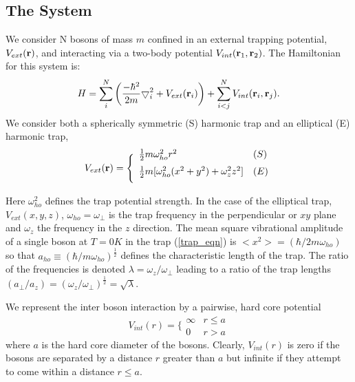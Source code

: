 \documentclass[aps,pra,twocolumn,groupedaddress]{revtex4}
\def\strut{\rule[-0.5cm]{0cm}{1cm}}
\begin{document}
\subsection{The System}
We consider N bosons of mass $m$ confined in an external 
trapping potential, $V_{ext}({\bf r})$, and interacting via a two-body 
potential $V_{int}({\bf r}_1,{\bf r}_2)$.  
The Hamiltonian for this system is:
\begin{equation}
    H = \sum_i^N \left(
        \frac{-\hbar^2}{2m}
        { \bigtriangledown }_{i}^2 +
        V_{ext}({\bf{r}}_i)\right)  +
        \sum_{i<j}^{N} V_{int}({\bf{r}}_i,{\bf{r}}_j).
\end{equation}
We consider both a 
spherically symmetric (S) harmonic trap and an elliptical (E) harmonic trap,
\begin{equation}
V_{ext}({\bf r}) = 
\Bigg\{
\begin{array}{ll}
        \frac{1}{2}m\omega_{ho}^2r^2 & (S)\\
\strut
	\frac{1}{2}m[\omega_{ho}^2(x^2+y^2) + \omega_z^2z^2] & (E)
\label{trap_eqn}
\end{array}
\end{equation}
Here $\omega_{ho}^2$ defines the trap potential strength.  In the case of the
elliptical trap, $V_{ext}(x,y,z)$, $\omega_{ho}=\omega_{\perp}$ is the trap frequency
in the perpendicular or $xy$ plane and $\omega_z$ the frequency in the $z$
direction.
The mean square vibrational amplitude of a single boson at $T=0K$ in the 
trap (\ref{trap_eqn}) is $<x^2>=(\hbar/2m\omega_{ho})$ so that 
$a_{ho} \equiv (\hbar/m\omega_{ho})^{\frac{1}{2}}$ defines the 
characteristic length
of the trap.  The ratio of the frequencies is denoted 
$\lambda=\omega_z/\omega_{\perp}$ leading to a ratio of the
trap lengths
$(a_{\perp}/a_z)=(\omega_z/\omega_{\perp})^{\frac{1}{2}} = \sqrt{\lambda}$.

We represent the inter boson interaction by a pairwise, hard core potential
\begin{equation}
V_{int}(r) =  \Bigg\{
\begin{array}{ll}
        \infty & {r} \leq {a}\\
        0 & {r} > {a}
\end{array}
\end{equation}
where ${a}$ is the hard core diameter of the bosons.  Clearly, $V_{int}(r)$
is zero if the bosons are separated by a distance $r$ greater than $a$ but
infinite if they attempt to come within a distance $r \leq a$.
\end{document}
